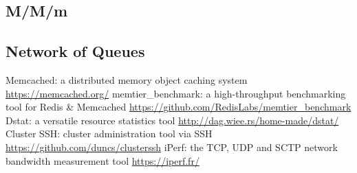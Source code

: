 \documentclass[11pt,a4paper]{article}
\begin{document}
\subsection{M/M/m} \label{sec:mmm}

\subsection{Network of Queues} \label{sec:network-of-queues}

\begin{thebibliography}{9}
 Memcached: a distributed memory object caching system \url{https://memcached.org/}
 memtier\_benchmark: a high-throughput benchmarking tool for Redis \& Memcached \url{https://github.com/RedisLabs/memtier\_benchmark}
 Dstat: a versatile resource statistics tool \url{http://dag.wiee.rs/home-made/dstat/}
 Cluster SSH: cluster administration tool via SSH \url{https://github.com/duncs/clusterssh}
 iPerf: the TCP, UDP and SCTP network bandwidth measurement tool \url{https://iperf.fr/}
\end{thebibliography}
\end{document}
